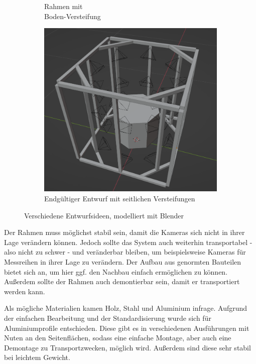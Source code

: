 \documentclass[./00PhotoBox.tex]{subfiles}
\begin{document}
\begin{figure}
\begin{subfigure}{0.30\textwidth}
        \centering
        \caption{Rahmen mit\\Boden-Versteifung}
        \label{img:entwurf2}
    \end{subfigure}
    \begin{subfigure}{0.30\textwidth}
        \includegraphics[height=1\linewidth]{./img/3_aufbau/modell3.png}
        \centering
        \caption{Endgültiger Entwurf mit seitlichen Versteifungen}
        \label{img:entwurf3}
    \end{subfigure}
    \caption{Verschiedene Entwurfsideen, modelliert mit Blender}
    \label{img:entwuerfe}
\end{figure}


Der Rahmen muss möglichst stabil sein, damit die Kameras sich nicht in ihrer Lage verändern können. Jedoch sollte das System auch weiterhin transportabel - also nicht zu schwer - und veränderbar bleiben, um beispielsweise Kameras für Messreihen in ihrer Lage zu verändern. Der Aufbau aus genormten Bauteilen bietet sich an, um hier ggf. den Nachbau einfach ermöglichen zu können. Außerdem sollte der Rahmen auch demontierbar sein, damit er transportiert werden kann.

Als mögliche Materialien kamen Holz, Stahl und Aluminium infrage. Aufgrund der einfachen Bearbeitung und der Standardisierung wurde sich für Aluminiumprofile entschieden. Diese gibt es in verschiedenen Ausführungen mit Nuten an den Seitenflächen, sodass eine einfache Montage, aber auch eine Demontage zu Transportzwecken, möglich wird. Außerdem sind diese sehr stabil bei leichtem Gewicht.
\end{document}
